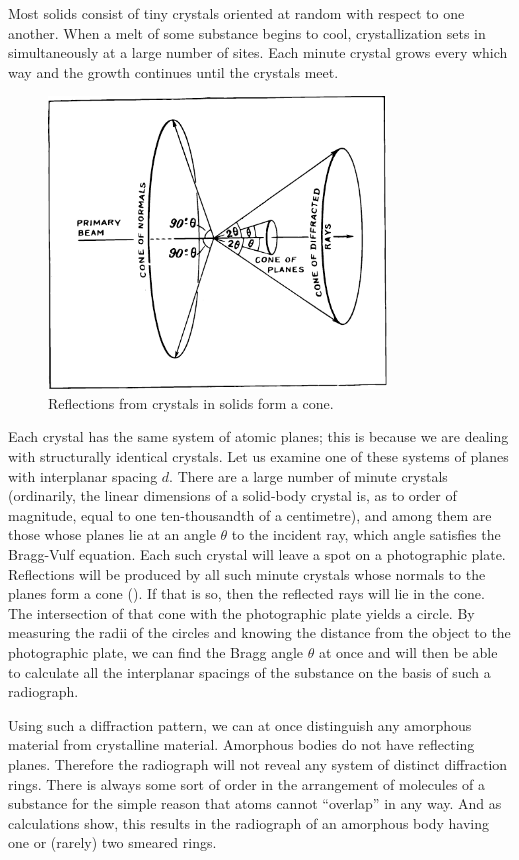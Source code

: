Most solids consist of tiny crystals oriented at random with respect to one another. When a melt of some sub­stance begins to cool, crystallization sets in simultaneous­ly at a large number of sites. Each minute crystal grows every which way and the growth continues until the crystals meet.
\begin{figure}[!ht]
\centering
\includegraphics[width=0.8\textwidth]{figures/fig-03-05.pdf}
\caption{Reflections from crystals in solids form a cone.}
\label{fig-3.5}
\end{figure}


Each crystal has the same system of atomic planes; this is because we are dealing with structurally identical crystals. Let us examine one of these systems of planes with interplanar spacing $d$. There are a large number of minute crystals (ordinarily, the linear dimensions of a solid-body crystal is, as to order of magnitude, equal to one ten-thousandth of a centimetre), and among them are those whose planes lie at an angle $\theta$ to the incident ray, which angle satisfies the Bragg-Vulf equation. Each such crystal will leave a spot on a photographic plate. Reflections will be produced by all such minute crystals whose normals to the planes form a cone (). If that is so, then the reflected rays will lie in the cone. The intersection of that cone with the photographic plate yields a circle. By measuring the radii of the circles and knowing the distance from the object to the photographic plate, we can find the Bragg angle $\theta$ at once and will then be able to calculate all the interplanar spacings of the substance on the basis of such a radiograph.


Using such a diffraction pattern, we can at once distinguish any amorphous material from crystalline material. Amorphous bodies do not have reflecting planes. Therefore the radiograph will not reveal any system of distinct diffraction rings. There is always some sort of order in the arrangement of molecules of a substance for the simple reason that atoms cannot ``overlap'' in any way. And as calculations show, this results in the radiograph of an amorphous body having one or (rarely) two smeared rings.

